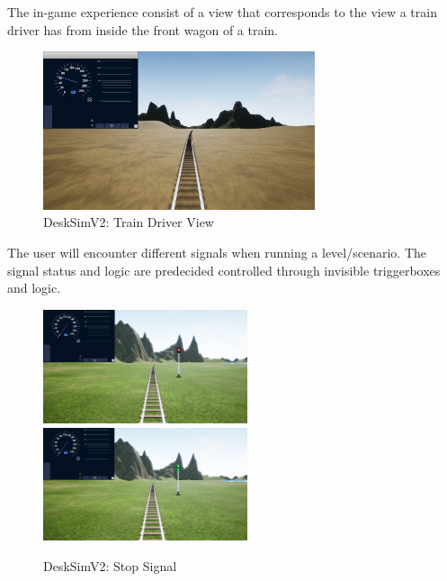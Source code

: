 The in-game experience consist of a view that corresponds to the view a train driver has from inside the front wagon of a train.
\bigskip
\begin{figure}[H]
    \centering
    \vspace{12pt}
    \includegraphics[width=8cm]{figures/Tog Drive.PNG}
    \caption{DeskSimV2: Train Driver View}
    \label{Train_Driver_View_img}
\end{figure}
\bigskip \bigskip

The user will encounter different signals when running a level/scenario. The signal status and logic are predecided controlled through invisible triggerboxes and logic. 


\begin{figure}[H]
    \centering
    \vspace{12pt}
    \includegraphics[width=6cm]{figures/Signal stop.PNG}
    \includegraphics[width=6cm]{figures/SignalStartcorr.png}
    \caption{DeskSimV2: Stop Signal}
    \label{Stop_Signal_img}
\end{figure} 
\bigskip \bigskip

